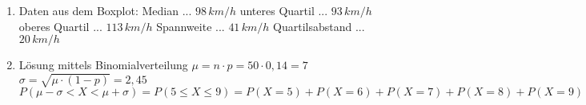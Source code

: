 \begin{langesbeispiel}
{\begin{enumerate}
	$$\overline{x}=\frac{1}{10}\cdot\sum_{i=1}^{10}{x_i=103,3}\,km/h$$
	$$s=\sqrt{\frac{1}{9}\cdot\sum_{i=1}^{10}{(x_i-\overline{x})^2}}=13,6\,km/h$$
	\item Daten aus dem Boxplot:
		 \subitem Median ... $98\,km/h$
		 \subitem unteres Quartil ... $93\,km/h$
		\subitem oberes Quartil ... $113\,km/h$
		\subitem Spannweite ... $41\,km/h$
		\subitem Quartilsabstand ... $20\,km/h$
	\item Lösung mittels Binomialverteilung
	\subitem $\mu=n\cdot p=50\cdot 0,14=7$
	\subitem $\sigma=\sqrt{\mu\cdot (1-p)}=2,45$
	\subitem $P(\mu-\sigma<X<\mu+\sigma)=P(5\leq X\leq 9)=P(X=5)+P(X=6)+P(X=7)+P(X=8)+P(X=9)=0,1286+0,1570+0,1606+0,1406+0,1068=0,6936=69,36\,\%$
\end{enumerate}}
\end{langesbeispiel}
